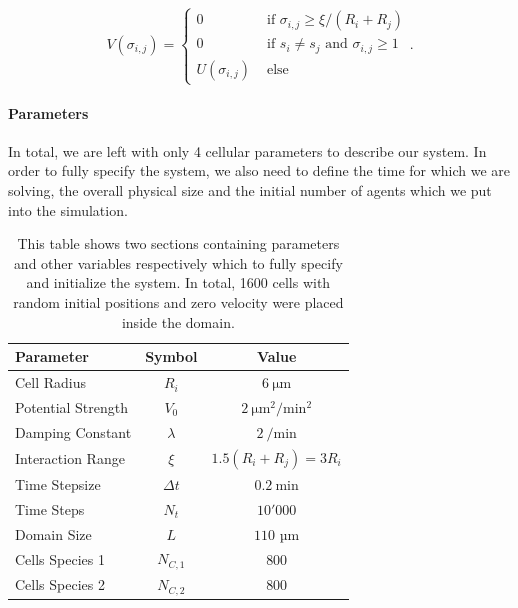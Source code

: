 \documentclass[fontsize=11pt,a4paper]{article}
\begin{document}
\begin{equation}
    V(\sigma_{i,j}) =
    \begin{cases}
        0 &\text{ if } \sigma_{i,j}\geq\xi/(R_i+R_j)\\
        0 &\text{ if } s_i\neq s_j \text{ and } \sigma_{i,j}\geq 1\\
        U(\sigma_{i,j}) &\text{ else }
    \end{cases}.
\end{equation}

\paragraph{Parameters}
In total, we are left with only 4 cellular parameters to describe our system.
In order to fully specify the system, we also need to define the time for which we are solving, the
overall physical size and the initial number of agents which we put into the simulation.

\begin{table}
    \centering
    \begin{tabular}{l c c}
        Parameter & Symbol & Value\\
        \hline
        Cell Radius & $R_i$ & $\SI{6}{\micro\metre}$\\
        Potential Strength & $V_0$ & $\SI{2}{\micro\metre^2\per\minute^2}$\\
        Damping Constant & $\lambda$ & $\SI{2}{\per\minute}$\\
        Interaction Range & $\xi$ & $1.5 (R_i+R_j)=3R_i$\\
        \hline
        Time Stepsize & $\Delta t$ & $\SI{0.2}{\minute}$\\
        Time Steps & $N_t$ & $10'000$\\
        Domain Size & $L$ & $110\text{ µm}$\\
        Cells Species 1 & $N_{C,1}$ & $800$\\
        Cells Species 2 & $N_{C,2}$ & $800$\\
    \end{tabular}
    \caption{
        This table shows two sections containing parameters and other variables respectively which
        to fully specify and initialize the system.
        In total, 1600 cells with random initial positions and zero velocity were placed inside the
        domain.
    }
    \label{tab:cell-sorting-parameters}
\end{table}
\end{document}
